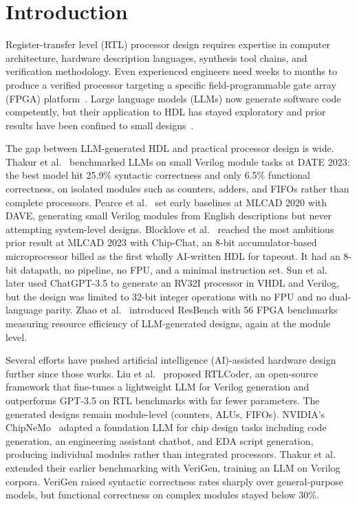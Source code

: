 \documentclass[journal]{IEEEtran}
\begin{document}
\section{Introduction}

Register-transfer level (RTL) processor design requires expertise in computer architecture, hardware description languages, synthesis tool chains, and verification methodology. Even experienced engineers need weeks to months to produce a verified processor targeting a specific field-programmable gate array (FPGA) platform~\cite{patterson2017cod}. Large language models (LLMs) now generate software code competently, but their application to HDL has stayed exploratory and prior results have been confined to small designs~\cite{thakur2023date, blocklove2023chipchat, pearce2020dave, sun2024hdlgen, zhao2025resbench}.

The gap between LLM-generated HDL and practical processor design is wide. Thakur et al.~\cite{thakur2023date} benchmarked LLMs on small Verilog module tasks at DATE 2023: the best model hit 25.9\% syntactic correctness and only 6.5\% functional correctness, on isolated modules such as counters, adders, and FIFOs rather than complete processors. Pearce et al.~\cite{pearce2020dave} set early baselines at MLCAD 2020 with DAVE, generating small Verilog modules from English descriptions but never attempting system-level designs. Blocklove et al.~\cite{blocklove2023chipchat} reached the most ambitious prior result at MLCAD 2023 with Chip-Chat, an 8-bit accumulator-based microprocessor billed as the first wholly AI-written HDL for tapeout. It had an 8-bit datapath, no pipeline, no FPU, and a minimal instruction set. Sun et al.~\cite{sun2024hdlgen} later used ChatGPT-3.5 to generate an RV32I processor in VHDL and Verilog, but the design was limited to 32-bit integer operations with no FPU and no dual-language parity. Zhao et al.~\cite{zhao2025resbench} introduced ResBench with 56 FPGA benchmarks measuring resource efficiency of LLM-generated designs, again at the module level.

Several efforts have pushed artificial intelligence (AI)-assisted hardware design further since those works. Liu et al.~\cite{liu2024rtlcoder} proposed RTLCoder, an open-source framework that fine-tunes a lightweight LLM for Verilog generation and outperforms GPT-3.5 on RTL benchmarks with far fewer parameters. The generated designs remain module-level (counters, ALUs, FIFOs). NVIDIA's ChipNeMo~\cite{chipnemo2024} adapted a foundation LLM for chip design tasks including code generation, an engineering assistant chatbot, and EDA script generation, producing individual modules rather than integrated processors. Thakur et al.~\cite{thakur2024verigen} extended their earlier benchmarking with VeriGen, training an LLM on Verilog corpora. VeriGen raised syntactic correctness rates sharply over general-purpose models, but functional correctness on complex modules stayed below 30\%.
\end{document}
